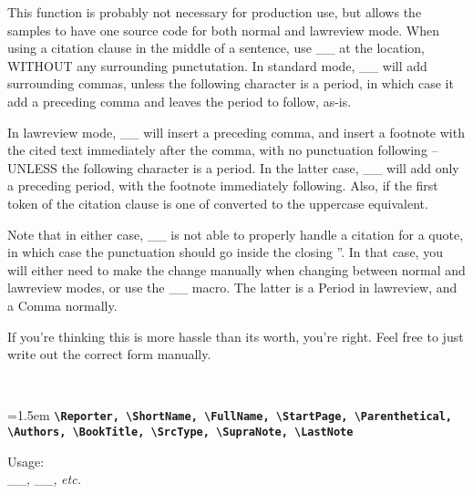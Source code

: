  \noindent This function is probably not necessary for production use, but allows the samples to have one source code for both
 normal and lawreview mode. When using a citation clause in the middle of a sentence, use _\citeclause_ at the location,
 WITHOUT any surrounding punctutation. In standard mode, _\citeclause_ will add surrounding commas, unless the following
 character is a period, in which case it add a preceding comma and leaves the period to follow, as-is.

 In lawreview mode, _\citeclause_ will insert a preceding comma, and insert a footnote with the cited text immediately 
 after the comma, with no punctuation following -- UNLESS the following character is a period. In the latter case, 
 _\citeclause_ will add only a preceding period, with the footnote immediately following. Also, if the first token of the 
 citation clause is one of %
 converted to the uppercase equivalent.

 Note that in either case, _\citeclause_ is not able to properly handle a citation for a quote, in which case the punctuation
 should go inside the closing ''. In that case, you will either need to make the change manually when changing between
 normal and lawreview modes, or use the _\PeriodOrComma_ macro. The latter is a Period in lawreview, and a Comma normally. 

 If you're thinking this is more hassle than its worth, you're right. Feel free to just write out the correct form manually.


~\par

\noindent
\begingroup\raggedright{}\hangindent=1.5em
\texttt{\bf \textbackslash{}Reporter, \textbackslash{}ShortName, \textbackslash{}FullName, \textbackslash{}StartPage, \textbackslash{}Parenthetical, \textbackslash{}Authors, \textbackslash{}BookTitle, \textbackslash{}SrcType, \textbackslash{}SupraNote, \textbackslash{}LastNote} \par\noindent
\endgroup
 Usage: \\
	_\Reporter_, _\StartPage_, \emph{etc.}

\begin{Example}
    \\
    \\
\end{Example}

